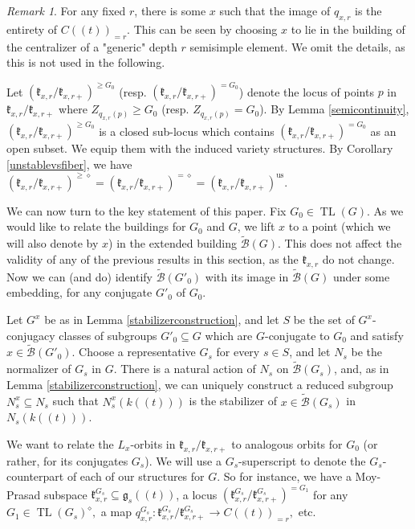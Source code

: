 \documentclass[12pt]{article}
\newcommand{\on}{\operatorname}
\DeclareMathOperator{\TL}{TL}
\theoremstyle{remark}
\newtheorem{remark}[theorem]{Remark}
\begin{document}
\begin{remark}
For any fixed $r$, there is some $x$ such that the image of $q_{x,r}$ is the entirety of $C((t))_{=r}.$ This can be seen by choosing $x$ to lie in the building of the centralizer of a "generic" depth $r$ semisimple element. We omit the details, as this is not used in the following.
\end{remark}

Let $(\mathfrak{k}_{x,r}/\mathfrak{k}_{x,r+})^{\geq G_0}$ (resp. $(\mathfrak{k}_{x,r}/\mathfrak{k}_{x,r+})^{=G_0}$) denote the locus of points $p$ in $\mathfrak{k}_{x,r}/\mathfrak{k}_{x,r+}$ where $Z_{q_{x,r}(p)}\geq G_0$ (resp. $Z_{q_{x,r}(p)}=G_0$). By Lemma \ref{semicontinuity}, $(\mathfrak{k}_{x,r}/\mathfrak{k}_{x,r+})^{\geq G_0}$ is a closed sub-locus which contains $(\mathfrak{k}_{x,r}/\mathfrak{k}_{x,r+})^{=G_0}$ as an open subset. We equip them with the induced variety structures. By Corollary \ref{unstablevsfiber}, we have $(\mathfrak{k}_{x,r}/\mathfrak{k}_{x,r+})^{\geq\diamond}=(\mathfrak{k}_{x,r}/\mathfrak{k}_{x,r+})^{=\diamond}=(\mathfrak{k}_{x,r}/\mathfrak{k}_{x,r+})^{\on{us}}.$

We can now turn to the key statement of this paper. Fix $G_0\in\TL(G)$. As we would like to relate the buildings for $G_0$ and $G$, we lift $x$ to a point (which we will also denote by $x$) in the extended building $\widetilde{\mathcal{B}}(G).$ This does not affect the validity of any of the previous results in this section, as the $\mathfrak{k}_{x,r}$ do not change. Now we can (and do) identify $\widetilde{\mathcal{B}}(G'_0)$ with its image in $\widetilde{\mathcal{B}}(G)$ under some embedding, for any conjugate $G'_0$ of $G_0$.

Let $G^x$ be as in Lemma \ref{stabilizerconstruction}, and let $S$ be the set of $G^x$-conjugacy classes of subgroups $G'_0\subseteq G$ which are $G$-conjugate to $G_0$ and satisfy $x\in\widetilde{\mathcal{B}}(G'_0)$. Choose a representative $G_s$ for every $s\in S$, and let $N_s$ be the normalizer of $G_s$ in $G$. There is a natural action of $N_s$ on $\widetilde{\mathcal{B}}(G_s)$, and, as in Lemma \ref{stabilizerconstruction}, we can uniquely construct a reduced subgroup $N_s^x\subseteq N_s$ such that $N_s^x(k((t)))$ is the stabilizer of $x\in\widetilde{\mathcal{B}}(G_s)$ in $N_s(k((t)))$.

We want to relate the $L_x$-orbits in $\mathfrak{k}_{x,r}/\mathfrak{k}_{x,r+}$ to analogous orbits for $G_0$ (or rather, for its conjugates $G_s$). We will use a $G_s$-superscript to denote the $G_s$-counterpart of each of our structures for $G$. So for instance, we have a Moy-Prasad subspace $\mathfrak{k}_{x,r}^{G_s}\subseteq\mathfrak{g}_s((t))$, a locus $(\mathfrak{k}_{x,r}^{G_s}/\mathfrak{k}_{x,r+}^{G_s})^{=G_1}$ for any $G_1\in\TL(G_s)^{\diamond},$ a map $q_{x,r}^{G_s}:\mathfrak{k}_{x,r}^{G_s}/\mathfrak{k}_{x,r+}^{G_s}\rightarrow C((t))_{=r},$ etc.
\end{document}
